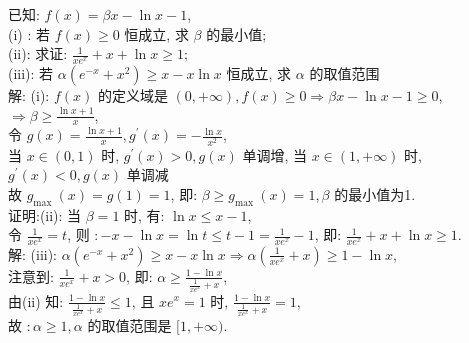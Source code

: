 \documentclass[a4paper,11pt,UTF8]{article}
\begin{document}
已知: $f(x)=\beta x-\ln x-1$,\\
(i) : 若 $f(x) \geq 0$ 恒成立, 求 $\beta$ 的最小值;\\
(ii): 求证: $\displaystyle\frac{1}{x e^x}+x+\ln x \geq 1$;\\
(iii): 若 $\alpha\left(e^{-x}+x^2\right) \geq x-x \ln x$ 恒成立, 求 $\alpha$ 的取值范围\\
解: (i): $f(x)$ 的定义域是 $(0,+\infty), f(x) \geq 0 \Rightarrow \beta x-\ln x-1 \geq 0$,
$\Rightarrow \beta \geq \frac{\ln x+1}{x}$,\\
 令 $\displaystyle g(x)=\displaystyle\frac{\ln x+1}{x}, g^{\prime}(x)=-\frac{\ln x}{x^2}$,\\
当 $x \in(0,1)$ 时, $g^{\prime}(x)>0, g(x)$ 单调增, 当 $x \in(1,+\infty)$ 时, $g^{\prime}(x)<0, g(x)$ 单调减\\
 故 $g_{\text {max }}(x)=g(1)=1$, 即: $\beta \geq g_{\text {max }}(x)=1, \beta$ 的最小值为1.\\
证明:(ii): 当 $\beta=1$ 时, 有: $\ln x \leq x-1$,\\
令 $\displaystyle\frac{1}{x e^x}=t$, 则 $:-x-\ln x=\ln t \leq t-1=\frac{1}{x e^x}-1$,
即: $\displaystyle\frac{1}{x e^x}+x+\ln x \geq 1$.\\
解: (iii): $\alpha\left(e^{-x}+x^2\right) \geq x-x \ln x \Rightarrow \alpha\left(\displaystyle\frac{1}{x e^x}+x\right) \geq 1-\ln x$,\\
注意到: $\displaystyle\frac{1}{x e^x}+x>0$, 即: $\displaystyle \alpha \geq \displaystyle\frac{1-\ln x}{\displaystyle\frac{1}{x e^x}+x}$,\\ 由(ii) 知: $\displaystyle\frac{1-\ln x}{\frac{1}{x e^x}+x} \leq 1$,
且 $x e^x=1$ 时, $\displaystyle\frac{1-\ln x}{\displaystyle\frac{1}{x e^x}+x}=1$,\\
 故 $: \alpha \geq 1, \alpha$ 的取值范围是 $[1,+\infty)$. \\
\end{document}
